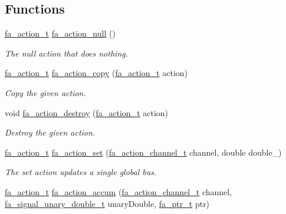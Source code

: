 \subsection*{Functions}
\begin{DoxyCompactItemize}
\item 
\hyperlink{group___fa_action_gadb08ae063168671e5fedc6c23f20ae4b}{fa\-\_\-action\-\_\-t} \hyperlink{group___fa_action_ga94bd955f72ccc7f9ca6d5f7692cac4b9}{fa\-\_\-action\-\_\-null} ()
\begin{DoxyCompactList}\small\item\em The {\ttfamily null} action that does nothing. \end{DoxyCompactList}\item 
\hyperlink{group___fa_action_gadb08ae063168671e5fedc6c23f20ae4b}{fa\-\_\-action\-\_\-t} \hyperlink{group___fa_action_ga91980a1205ebea92b42647d78347edc7}{fa\-\_\-action\-\_\-copy} (\hyperlink{group___fa_action_gadb08ae063168671e5fedc6c23f20ae4b}{fa\-\_\-action\-\_\-t} action)
\begin{DoxyCompactList}\small\item\em Copy the given action. \end{DoxyCompactList}\item 
void \hyperlink{group___fa_action_ga43f9d05194a02cf4ea671342783be64a}{fa\-\_\-action\-\_\-destroy} (\hyperlink{group___fa_action_gadb08ae063168671e5fedc6c23f20ae4b}{fa\-\_\-action\-\_\-t} action)
\begin{DoxyCompactList}\small\item\em Destroy the given action. \end{DoxyCompactList}\item 
\hyperlink{group___fa_action_gadb08ae063168671e5fedc6c23f20ae4b}{fa\-\_\-action\-\_\-t} \hyperlink{group___fa_action_ga581ee60177355c84edb8bb919d4a4170}{fa\-\_\-action\-\_\-set} (\hyperlink{group___fa_action_ga042610e7e8a7615937f5eeb3a8d789c5}{fa\-\_\-action\-\_\-channel\-\_\-t} channel, double double\-\_\-)
\begin{DoxyCompactList}\small\item\em The {\ttfamily set} action updates a single global bus. \end{DoxyCompactList}\item 
\hyperlink{group___fa_action_gadb08ae063168671e5fedc6c23f20ae4b}{fa\-\_\-action\-\_\-t} \hyperlink{group___fa_action_ga6f5d14e19e9042a46f751659b0672285}{fa\-\_\-action\-\_\-accum} (\hyperlink{group___fa_action_ga042610e7e8a7615937f5eeb3a8d789c5}{fa\-\_\-action\-\_\-channel\-\_\-t} channel, \hyperlink{group___fa_signal_gaced7eb8d67eb2fe39927934c4abc7255}{fa\-\_\-signal\-\_\-unary\-\_\-double\-\_\-t} unary\-Double, \hyperlink{group___fa_ga915ddeae99ad7568b273d2b876425197}{fa\-\_\-ptr\-\_\-t} ptr)

\end{DoxyCompactItemize}
